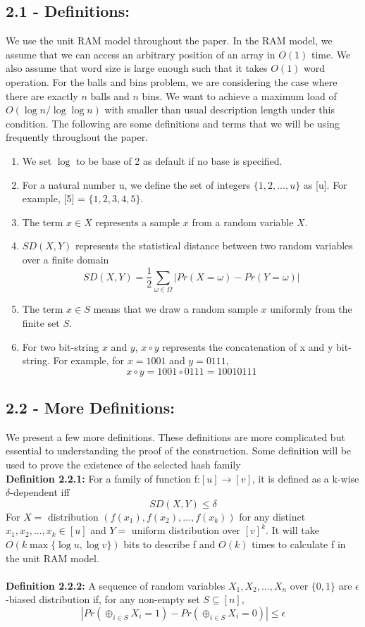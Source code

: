 \documentclass[a4paper, english]{paper}
\begin{document}
	\subsection{2.1 - Definitions:}
	We use the unit RAM model throughout the paper. In the RAM model, we assume that we can access an arbitrary position of an array in $O(1)$ time. We also assume that word size is large enough such that it takes $O(1)$ word operation. For the balls and bins problem, we are considering the case where there are exactly $n$ balls and $n$ bins. We want to achieve a maximum load of $O(\log n/ \log \log n)$ with smaller than usual description length under this condition. The following are some definitions and terms that we will be using frequently throughout the paper.
	\begin{enumerate}
	\item We set $\log$ to be base of 2 as default if no base is specified. 
	\item For a natural number u, we define the set of integers $\{1, 2, ..., u\}$ as [u].  For example, [5] = $\{1,2,3,4,5\}$.
	\item The term $x \in X$ represents a sample $x$ from a random variable $X$.
	\item  $SD(X, Y)$ represents the statistical distance between two random variables over a finite domain
		$$SD(X, Y) = \frac{1}{2}\sum_{\omega\in \Omega}| Pr(X= \omega) - Pr(Y= \omega)|$$
	\item The term $x \in S$ means that we draw a random sample $x$ uniformly from the finite set $S$.
	\item For two bit-string $x$ and $y$, $x \circ y$ represents the concatenation of x and y bit-string. For example, for $x = 1001$ and $y = 0111$, 
		$$x \circ y = 1001 \circ 0111 = 10010111$$
	\end{enumerate}
	
	\subsection{2.2 - More Definitions:}
	We present a few more definitions. These definitions are more complicated but essential to understanding the proof of the construction. Some definition will be used to prove the existence of the selected hash family \\
	
	\noindent\textbf{Definition 2.2.1:} 
	For a family of function f:$[u]\rightarrow[v]$, it is defined as  a k-wise $\delta$-dependent iff
		$$SD(X,Y)\le \delta$$
	For $X= $ distribution $(f(x_1),f(x_2),...,f(x_k))$ for any distinct $x_1,x_2,...,x_k\in[u]$ and $Y=$ uniform distribution over $[v]^k$.
	It will take $O(k\max\{\log u, \log v\})$ bits to describe f and $O(k)$ times to calculate f in the unit RAM model.\\\\
\textbf{Definition 2.2.2: }
	A sequence of random variables $X_1,X_2,...,X_n$ over $\{0,1\}$ are $\epsilon$-biased distribution if, for any non-empty set $S\subseteq [n]$,
	$$|Pr(\oplus_{i\in S} X_i = 1)-Pr(\oplus_{i\in S} X_i = 0)|\le \epsilon$$
	
\end{document}
